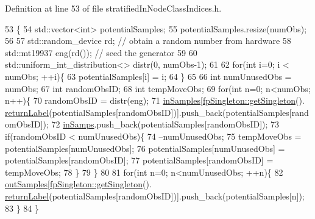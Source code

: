 Definition at line 53 of file stratified\+In\+Node\+Class\+Indices.\+h.


\begin{DoxyCode}
53                                                              \{
54                 std::vector<int> potentialSamples;
55                 potentialSamples.resize(numObs);
56 
57                 std::random\_device rd; \textcolor{comment}{// obtain a random number from hardware}
58                 std::mt19937 eng(rd()); \textcolor{comment}{// seed the generator}
59 
60                 std::uniform\_int\_distribution<> distr(0, numObs-1);
61 
62                 \textcolor{keywordflow}{for}(\textcolor{keywordtype}{int} i=0; i < numObs; ++i)\{
63                     potentialSamples[i] = i;
64                 \}
65 
66                 \textcolor{keywordtype}{int} numUnusedObs = numObs;
67                 \textcolor{keywordtype}{int} randomObsID;
68                 \textcolor{keywordtype}{int} tempMoveObs;
69                 \textcolor{keywordflow}{for}(\textcolor{keywordtype}{int} n=0; n<numObs; n++)\{
70                     randomObsID = distr(eng);
71                     \hyperlink{classfp_1_1stratifiedInNodeClassIndices_a6bfa636c77b48163f5d245959ea753d0}{inSamples}[\hyperlink{classfp_1_1fpSingleton_a8bdae77b68521003e3fc630edec2e240}{fpSingleton::getSingleton}().
      \hyperlink{classfp_1_1fpSingleton_aa2f644b1521948fb994f4087ddfaea14}{returnLabel}(potentialSamples[randomObsID])].push\_back(potentialSamples[randomObsID]);
72                     \hyperlink{classfp_1_1stratifiedInNodeClassIndices_ab6be4d82677c462494a4b4ef90c79bde}{inSamps}.push\_back(potentialSamples[randomObsID]);
73                     \textcolor{keywordflow}{if}(randomObsID < numUnusedObs)\{
74                         --numUnusedObs;
75                         tempMoveObs = potentialSamples[numUnusedObs];
76                         potentialSamples[numUnusedObs] = potentialSamples[randomObsID];
77                         potentialSamples[randomObsID] = tempMoveObs;
78                     \}
79                 \}
80 
81                 \textcolor{keywordflow}{for}(\textcolor{keywordtype}{int} n=0; n<numUnusedObs; ++n)\{
82                     \hyperlink{classfp_1_1stratifiedInNodeClassIndices_aa569f727e65e0b4b0815e71c1ee819e8}{outSamples}[\hyperlink{classfp_1_1fpSingleton_a8bdae77b68521003e3fc630edec2e240}{fpSingleton::getSingleton}().
      \hyperlink{classfp_1_1fpSingleton_aa2f644b1521948fb994f4087ddfaea14}{returnLabel}(potentialSamples[randomObsID])].push\_back(potentialSamples[n]);
83                 \}
84             \}
\end{DoxyCode}
